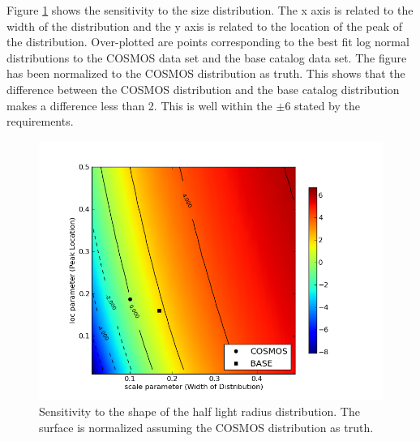 \documentclass[]{article}
\begin{document}
Figure \ref{fig:size_sens} shows the sensitivity to the size distribution.  The x axis is related to the width of the 
distribution and the y axis is related to the location of the peak of the distribution. Over-plotted are points corresponding
to the best fit log normal distributions to the COSMOS data set and the base catalog data set.  The figure has been
normalized to the COSMOS distribution as truth.  This shows that the difference between the COSMOS distribution and
the base catalog distribution makes a difference less than 2.  This is well within the $\pm6$ stated by the requirements.
\begin{figure}
\centering
\includegraphics[width=5in]{validation_figures/size_sensitivity.png}
\caption{Sensitivity to the shape of the half light radius distribution.  The surface is normalized assuming the COSMOS distribution as truth.\label{fig:size_sens}}
\end{figure}
\end{document}
